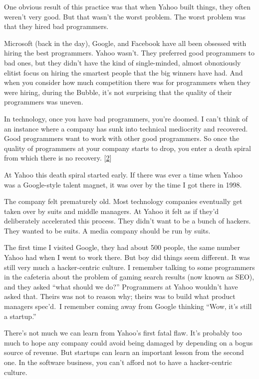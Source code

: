 One obvious result of this practice was that when Yahoo built things,
they often weren't very good. But that wasn't the worst problem. The
worst problem was that they hired bad programmers.

Microsoft (back in the day), Google, and Facebook have all been obsessed
with hiring the best programmers. Yahoo wasn't. They preferred good
programmers to bad ones, but they didn't have the kind of single-minded,
almost obnoxiously elitist focus on hiring the smartest people that the
big winners have had. And when you consider how much competition there
was for programmers when they were hiring, during the Bubble, it's not
surprising that the quality of their programmers was uneven.

In technology, once you have bad programmers, you're doomed. I can't
think of an instance where a company has sunk into technical mediocrity
and recovered. Good programmers want to work with other good
programmers. So once the quality of programmers at your company starts
to drop, you enter a death spiral from which there is no recovery.
{[}\hyperref[f2n]{2}{]}

At Yahoo this death spiral started early. If there was ever a time when
Yahoo was a Google-style talent magnet, it was over by the time I got
there in 1998.

The company felt prematurely old. Most technology companies eventually
get taken over by suits and middle managers. At Yahoo it felt as if
they'd deliberately accelerated this process. They didn't want to be a
bunch of hackers. They wanted to be suits. A media company should be run
by suits.

The first time I visited Google, they had about 500 people, the same
number Yahoo had when I went to work there. But boy did things seem
different. It was still very much a hacker-centric culture. I remember
talking to some programmers in the cafeteria about the problem of gaming
search results (now known as SEO), and they asked ``what should we do?''
Programmers at Yahoo wouldn't have asked that. Theirs was not to reason
why; theirs was to build what product managers spec'd.~I remember coming
away from Google thinking ``Wow, it's still a startup.''

There's not much we can learn from Yahoo's first fatal flaw. It's
probably too much to hope any company could avoid being damaged by
depending on a bogus source of revenue. But startups can learn an
important lesson from the second one. In the software business, you
can't afford not to have a hacker-centric culture.

